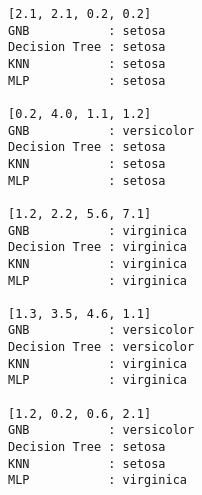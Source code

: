 \documentclass[11pt]{article}
\begin{document}
    \begin{Verbatim}[commandchars=\\\{\}]
[2.1, 2.1, 0.2, 0.2]
GNB           : setosa
Decision Tree : setosa
KNN           : setosa
MLP           : setosa

[0.2, 4.0, 1.1, 1.2]
GNB           : versicolor
Decision Tree : setosa
KNN           : setosa
MLP           : setosa

[1.2, 2.2, 5.6, 7.1]
GNB           : virginica
Decision Tree : virginica
KNN           : virginica
MLP           : virginica

[1.3, 3.5, 4.6, 1.1]
GNB           : versicolor
Decision Tree : versicolor
KNN           : virginica
MLP           : virginica

[1.2, 0.2, 0.6, 2.1]
GNB           : versicolor
Decision Tree : setosa
KNN           : setosa
MLP           : virginica


    \end{Verbatim}


    
    
    
    
\end{document}
